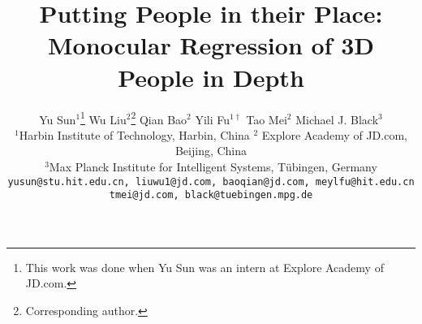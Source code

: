 \documentclass[10pt,twocolumn,letterpaper]{article}
\begin{document}
\title{Putting People in their Place: Monocular Regression of 3D People in Depth}
\makeatletter
\g@addto@macro{}

\author{Yu Sun$^1$\thanks{This work was done when Yu Sun was an intern at Explore Academy of JD.com. }\quad
Wu Liu$^{2}$\thanks{Corresponding author.} \quad
Qian Bao$^2$ \quad
Yili Fu$^{1\dagger}$\quad
Tao Mei$^2$\quad
Michael J. Black$^3$ \quad \\

$^1$Harbin Institute of Technology, Harbin, China \quad $^2$ Explore Academy of JD.com, Beijing, China \\
$^3$Max Planck Institute for Intelligent Systems, T\"ubingen, Germany\\
{\tt\small \texttt{yusun@stu.hit.edu.cn, liuwu1@jd.com, baoqian@jd.com, meylfu@hit.edu.cn}}\\
{\tt\small\texttt{tmei@jd.com, black@tuebingen.mpg.de}}\vspace{-2mm}
}

\makeatother

\maketitle
\end{document}
